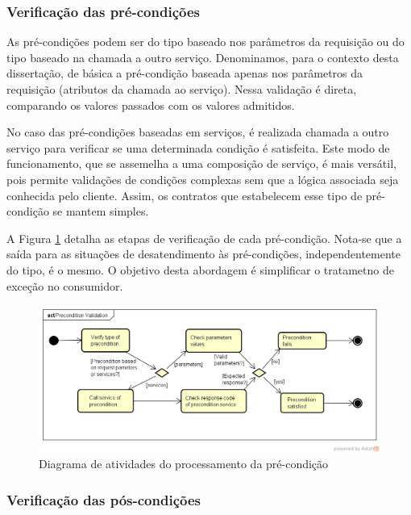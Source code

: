 \vspace{-6mm}


\subsubsection{Verificação das pré-condições}
\vspace{-6mm}

As pré-condições podem ser do tipo baseado nos parâmetros da requisição ou do
tipo baseado na chamada a outro serviço. Denominamos, para o contexto desta
dissertação, de básica a pré-condição baseada apenas nos parâmetros da
requisição (atributos da chamada ao serviço). Nessa validação é direta,
comparando os valores passados com os valores admitidos. 

No caso das pré-condições baseadas em serviços, é realizada chamada a outro
serviço para verificar se uma determinada condição é satisfeita. Este modo de
funcionamento, que se assemelha a uma composição de serviço, é mais versátil, pois permite
validações de condições complexas sem que a lógica associada seja conhecida pelo
cliente. Assim, os contratos que estabelecem esse tipo de
pré-condição se mantem simples.

A Figura \ref{FigServicePrecondition} detalha as etapas de verificação de cada
pré-condição. Nota-se que a saída para as situações de desatendimento às
pré-condições, independentemente do tipo, é o mesmo. O objetivo desta abordagem
é simplificar o tratametno de exceção no consumidor.

\begin{figure}[!htb]
\centering
\includegraphics[width=\textwidth,trim = 0mm 5mm 0mm 0mm,clip]{PreconditionValidation.png}
\caption{Diagrama de atividades do processamento da pré-condição}
\label{FigServicePrecondition}
\end{figure}


\subsubsection{Verificação das pós-condições}
\vspace{-6mm}

